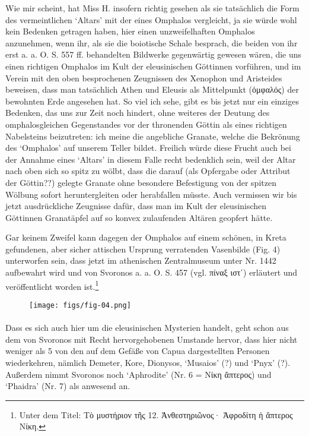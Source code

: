 \documentclass[a4paper, 11pt, oneside]{article}
\begin{document}
Wie mir scheint, hat Miss H. insofern richtig gesehen als sie tatsächlich die Form des vermeintlichen `Altars' mit der eines Omphalos vergleicht, ja sie würde wohl kein Bedenken getragen haben, hier einen unzweifelhaften Omphalos anzunehmen, wenn ihr, als sie die boiotische Schale besprach, die beiden von ihr erst a. a. O. S. 557 ff. behandelten Bildwerke gegenwärtig gewesen wären, die uns einen richtigen Omphalos im Kult der eleusinischen Göttinnen vorführen, und im Verein mit den oben besprochenen Zeugnissen des Xenophon und Aristeides beweisen, dass man tatsächlich Athen und Eleusis als Mittelpunkt (ὀμφαλός) der bewohnten Erde angesehen hat. So viel ich sehe, gibt es bis jetzt nur ein einziges Bedenken, das uns zur Zeit noch hindert, ohne weiteres der Deutung des omphalosgleichen Gegenstandes vor der thronenden Göttin als eines richtigen Nabelsteins beizutreten: ich meine die angebliche Granate, welche die Bekrönung des `Omphalos' auf unserem Teller bildet. Freilich würde diese Frucht auch bei der Annahme eines `Altars' in diesem Falle recht bedenklich sein, weil der Altar nach oben sich so spitz zu wölbt, dass die darauf (als Opfergabe oder Attribut der Göttin??) gelegte Granate ohne besondere Befestigung von der spitzen Wölbung sofort heruntergleiten oder herabfallen müsste. Auch vermissen wir bis jetzt ausdrückliche Zeugnisse dafür, dass man im Kult der eleusinischen Göttinnen Granatäpfel auf so konvex zulaufenden Altären geopfert hätte.

Gar keinem Zweifel kann dagegen der Omphalos auf einem schönen, in Kreta gefundenen, aber sicher attischen Ursprung verratenden Vasenbilde (Fig. 4) unterworfen sein, dass jetzt im athenischen Zentralmuseum unter Nr. 1442 aufbewahrt wird und von Svoronos a. a. O. S. 457 (vgl. πίναξ ιστʹ) erläutert und veröffentlicht worden ist.\footnote{Unter dem Titel: Τὸ μυστήριον τῆς 12. Ἀνθεστηριῶνος· Ἀφροδίτη ἡ ἄπτερος Νίκη.}

\begin{figure}[H]
\centering
\texttt{[image: figs/fig-04.png]}
\caption{}
\end{figure}
\paragraph{}
Dass es sich auch hier um die eleusinischen Mysterien handelt, geht schon aus dem von Svoronos mit Recht hervorgehobenen Umstande hervor, dass hier nicht weniger als 5 von den auf dem Gefäße von Capua dargestellten Personen wiederkehren, nämlich Demeter, Kore, Dionysos, `Musaios' (?) und `Pnyx' (?). Außerdem nimmt Svoronos noch `Aphrodite' (Nr. 6 = Νίκη ἄπτερος) und `Phaidra' (Nr. 7) als anwesend an.
\end{document}
